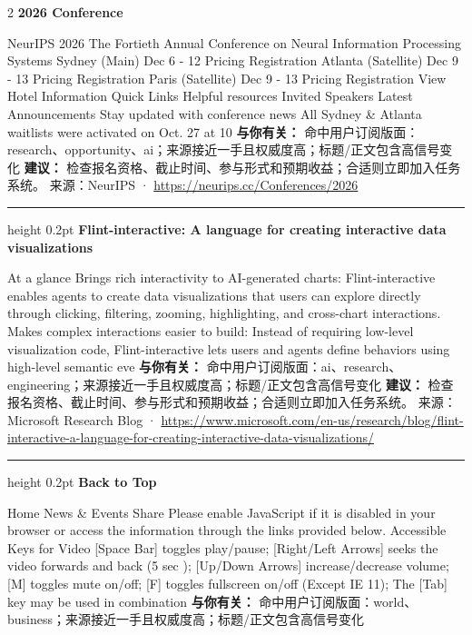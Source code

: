 \documentclass[10.5pt]{ctexart}
\begin{document}
\begin{multicols}{2}
{\large\bfseries 2026 Conference}\par
NeurIPS 2026 The Fortieth Annual Conference on Neural Information Processing Systems Sydney (Main) Dec 6 - 12 Pricing Registration Atlanta (Satellite) Dec 9 - 13 Pricing Registration Paris (Satellite) Dec 9 - 13 Pricing Registration View Hotel Information Quick Links Helpful resources Invited Speakers Latest Announcements Stay updated with conference news All Sydney \& Atlanta waitlists were activated on Oct. 27 at 10
\textbf{与你有关：} 命中用户订阅版面：research、opportunity、ai；来源接近一手且权威度高；标题/正文包含高信号变化
\textbf{建议：} 检查报名资格、截止时间、参与形式和预期收益；合适则立即加入任务系统。
{\footnotesize\color{ormuted} 来源：NeurIPS · \url{https://neurips.cc/Conferences/2026}}
\vspace{2mm}
\hrule height 0.2pt
\vspace{2mm}
{\large\bfseries Flint-interactive: A language for creating interactive data visualizations}\par
At a glance Brings rich interactivity to AI-generated charts: Flint-interactive enables agents to create data visualizations that users can explore directly through clicking, filtering, zooming, highlighting, and cross-chart interactions. Makes complex interactions easier to build: Instead of requiring low-level visualization code, Flint-interactive lets users and agents define behaviors using high-level semantic eve
\textbf{与你有关：} 命中用户订阅版面：ai、research、engineering；来源接近一手且权威度高；标题/正文包含高信号变化
\textbf{建议：} 检查报名资格、截止时间、参与形式和预期收益；合适则立即加入任务系统。
{\footnotesize\color{ormuted} 来源：Microsoft Research Blog · \url{https://www.microsoft.com/en-us/research/blog/flint-interactive-a-language-for-creating-interactive-data-visualizations/}}
\vspace{2mm}
\hrule height 0.2pt
\vspace{2mm}
{\large\bfseries Back to Top}\par
Home News \& Events Share Please enable JavaScript if it is disabled in your browser or access the information through the links provided below. Accessible Keys for Video [Space Bar] toggles play/pause; [Right/Left Arrows] seeks the video forwards and back (5 sec ); [Up/Down Arrows] increase/decrease volume; [M] toggles mute on/off; [F] toggles fullscreen on/off (Except IE 11); The [Tab] key may be used in combination
\textbf{与你有关：} 命中用户订阅版面：world、business；来源接近一手且权威度高；标题/正文包含高信号变化

\end{multicols}
\end{document}
